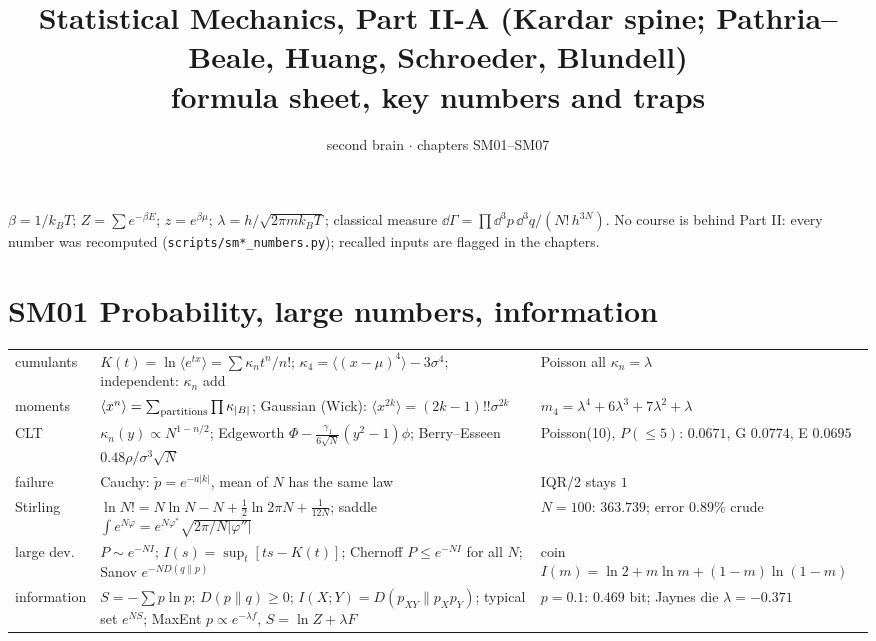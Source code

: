 \documentclass[9pt]{article}
\title{Statistical Mechanics, Part II-A (Kardar spine; Pathria--Beale, Huang, Schroeder, Blundell)\\\large formula sheet, key numbers and traps}
\author{second brain $\cdot$ chapters SM01--SM07}
\date{}
\begin{document}
\maketitle
\vspace{-2.2em}

\begin{keybox}[Conventions]
$\beta=1/k_BT$; $Z=\sum e^{-\beta E}$; $z=e^{\beta\mu}$; $\lambda=h/\sqrt{2\pi mk_BT}$; classical measure $\dd\Gamma=\prod\dd^3p\,\dd^3q/(N!\,h^{3N})$. No course is behind Part II: every number was recomputed (\texttt{scripts/sm*\_numbers.py}); recalled inputs are flagged in the chapters.
\end{keybox}

\section*{SM01 Probability, large numbers, information}
\begin{tabular}{@{}p{2.9cm}p{8.9cm}p{5.6cm}@{}}
\toprule
cumulants & $K(t)=\ln\langle e^{tx}\rangle=\sum\kappa_nt^n/n!$; $\kappa_4=\langle(x-\mu)^4\rangle-3\sigma^4$; independent: $\kappa_n$ add & Poisson all $\kappa_n=\lambda$\\
moments & $\langle x^n\rangle=\sum_{\rm partitions}\prod\kappa_{|B|}$; Gaussian (Wick): $\langle x^{2k}\rangle=(2k-1)!!\sigma^{2k}$ & $m_4=\lambda^4+6\lambda^3+7\lambda^2+\lambda$\\
CLT & $\kappa_n(y)\propto N^{1-n/2}$; Edgeworth $\Phi-\tfrac{\gamma_1}{6\sqrt N}(y^2-1)\phi$; Berry--Esseen $0.48\rho/\sigma^3\sqrt N$ & Poisson(10), $P(\le5)$: $0.0671$, G $0.0774$, E $0.0695$\\
failure & Cauchy: $\tilde p=e^{-a|k|}$, mean of $N$ has the same law & IQR/2 stays $1$\\
Stirling & $\ln N!=N\ln N-N+\tfrac12\ln2\pi N+\tfrac1{12N}$; saddle $\int e^{N\varphi}=e^{N\varphi^*}\sqrt{2\pi/N|\varphi''|}$ & $N=100$: $363.739$; error $0.89\%$ crude\\
large dev. & $P\sim e^{-NI}$; $I(s)=\sup_t[ts-K(t)]$; Chernoff $P\le e^{-NI}$ for all $N$; Sanov $e^{-ND(q\|p)}$ & coin $I(m)=\ln2+m\ln m+(1-m)\ln(1-m)$\\
information & $S=-\sum p\ln p$; $D(p\|q)\ge0$; $I(X;Y)=D(p_{XY}\|p_Xp_Y)$; typical set $e^{NS}$; MaxEnt $p\propto e^{-\lambda f}$, $S=\ln Z+\lambda F$ & $p=0.1$: $0.469$ bit; Jaynes die $\lambda=-0.371$\\
\bottomrule
\end{tabular}
\end{document}
